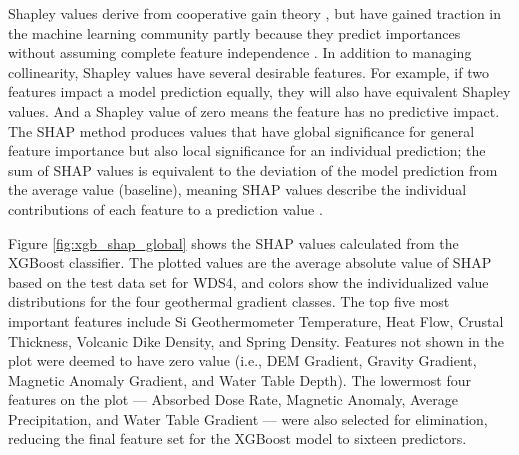 Shapley values derive from cooperative gain theory \citep{shapley_value_1997}, but have gained traction in the machine learning community partly because they predict importances without assuming complete feature independence \citep{lundberg_unified_2017}. In addition to managing collinearity, Shapley values have several desirable features. For example, if two features impact a model prediction equally, they will also have equivalent Shapley values. And a Shapley value of zero means the feature has no predictive impact. The SHAP method produces values that have global significance for general feature importance but also local significance for an individual prediction; the sum of SHAP values is equivalent to the deviation of the model prediction from the average value (baseline), meaning SHAP values describe the individual contributions of each feature to a prediction value \citep{lundberg_unified_2017}.

Figure \ref{fig:xgb_shap_global} shows the SHAP values calculated from the XGBoost classifier. The plotted values are the average absolute value of SHAP based on the test data set for WDS4, and colors show the individualized value distributions for the four geothermal gradient classes. The top five most important features include Si Geothermometer Temperature, Heat Flow, Crustal Thickness, Volcanic Dike Density, and Spring Density.  Features not shown in the plot were deemed to have zero value (i.e., DEM Gradient, Gravity Gradient, Magnetic Anomaly Gradient, and Water Table Depth). The lowermost four features on the plot --- Absorbed Dose Rate, Magnetic Anomaly, Average Precipitation, and Water Table Gradient --- were also selected for elimination, reducing the final feature set for the XGBoost model to sixteen predictors.

